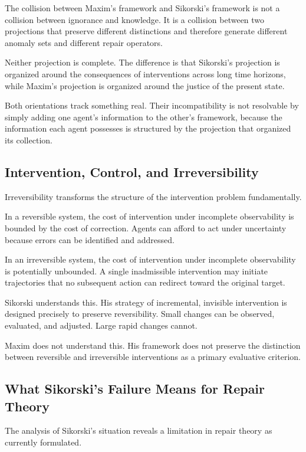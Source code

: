 \documentclass[12pt, a4paper]{article}
\theoremstyle{plain}
\theoremstyle{definition}
\theoremstyle{remark}
\begin{document}
The collision between Maxim's framework and
Sikorski's framework is not a collision between
ignorance and knowledge. It is a collision between
two projections that preserve different distinctions
and therefore generate different anomaly sets and
different repair operators.

Neither projection is complete. The difference is
that Sikorski's projection is organized around
the consequences of interventions across long time
horizons, while Maxim's projection is organized
around the justice of the present state.

Both orientations track something real. Their
incompatibility is not resolvable by simply adding
one agent's information to the other's framework,
because the information each agent possesses is
structured by the projection that organized
its collection.

\subsection{Intervention, Control, and Irreversibility}

Irreversibility transforms the structure of the
intervention problem fundamentally.

In a reversible system, the cost of intervention
under incomplete observability is bounded by the
cost of correction. Agents can afford to act under
uncertainty because errors can be identified and
addressed.

In an irreversible system, the cost of intervention
under incomplete observability is potentially
unbounded. A single inadmissible intervention may
initiate trajectories that no subsequent action
can redirect toward the original target.

Sikorski understands this. His strategy of
incremental, invisible intervention is designed
precisely to preserve reversibility. Small changes
can be observed, evaluated, and adjusted. Large
rapid changes cannot.

Maxim does not understand this. His framework does
not preserve the distinction between reversible
and irreversible interventions as a primary
evaluative criterion.

\subsection{What Sikorski's Failure Means for Repair Theory}

The analysis of Sikorski's situation reveals a
limitation in repair theory as currently formulated.
\end{document}
